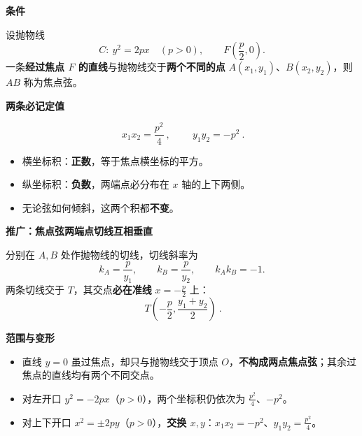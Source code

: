\begin{statementbox}
\textbf{\textcolor{CStatement}{条件}}\par\smallskip
设抛物线
\[
 C:\ y^2=2px\quad(p>0),\qquad F\!\left(\frac p2,0\right).
\]
一条\textbf{经过焦点 $F$ 的直线}与抛物线交于\textbf{两个不同的点}
$A(x_1,y_1)$、$B(x_2,y_2)$，则 $AB$ 称为焦点弦。

\medskip
\textbf{\textcolor{CStatement}{两条必记定值}}\par\smallskip
\[
 \boxed{\ x_1x_2=\frac{p^2}{4}\ },\qquad
 \boxed{\ y_1y_2=-p^2\ }.
\]
\begin{itemize}[leftmargin=*,itemsep=0.25em]
 \item 横坐标积：\textbf{正数}，等于焦点横坐标的平方。
 \item 纵坐标积：\textbf{负数}，两端点必分布在 $x$ 轴的上下两侧。
 \item 无论弦如何倾斜，这两个积都\textbf{不变}。
\end{itemize}

\medskip
\textbf{\textcolor{CStatement}{推广：焦点弦两端点切线互相垂直}}\par\smallskip
分别在 $A,B$ 处作抛物线的切线，切线斜率为
\[
 k_A=\frac{p}{y_1},\qquad k_B=\frac{p}{y_2},\qquad
 \boxed{k_Ak_B=-1}.
\]
两条切线交于 $T$，其交点\textbf{必在准线} $x=-\frac p2$ 上：
\[
 \boxed{\ T\!\left(-\frac p2,\frac{y_1+y_2}{2}\right)\ }.
\]

\medskip
\textbf{\textcolor{CStatement}{范围与变形}}\par\smallskip
\begin{itemize}[leftmargin=*,itemsep=0.2em]
 \item 直线 $y=0$ 虽过焦点，却只与抛物线交于顶点 $O$，\textbf{不构成两点焦点弦}；其余过焦点的直线均有两个不同交点。
 \item 对左开口 $y^2=-2px$（$p>0$），两个坐标积仍依次为 $\frac{p^2}{4}$、$-p^2$。
 \item 对上下开口 $x^2=\pm2py$（$p>0$），\textbf{交换 $x,y$}：$x_1x_2=-p^2$、$y_1y_2=\frac{p^2}{4}$。
\end{itemize}
\end{statementbox}
